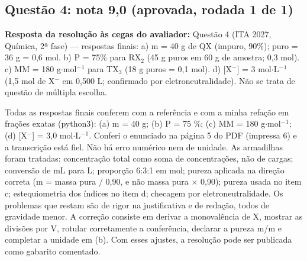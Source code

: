 \documentclass{article}%
\begin{document}
\subsection*{Questão 4: nota 9,0 (aprovada, rodada 1 de 1)}%
\textbf{Resposta da resolução às cegas do avaliador:} Questão 4 (ITA 2027, Química, 2ª fase) --- respostas finais:\newline%
\newline%
a) m = 40 g de QX (impuro, 90\%); puro = 36 g = 0,6 mol.\newline%
b) P = 75\% para RX$_{2}$ (45 g puros em 60 g de amostra; 0,3 mol).\newline%
c) MM = 180 g$\cdot$mol$^{-}$$^{1}$ para TX$_{3}$ (18 g puros = 0,1 mol).\newline%
d) {[}X$^{-}${]} = 3 mol$\cdot$L$^{-}$$^{1}$ (1,5 mol de X$^{-}$ em 0,500 L; confirmado por eletroneutralidade).\newline%
\newline%
Não se trata de questão de múltipla escolha.\par %
Todas as respostas finais conferem com a referência e com a minha refação em frações exatas (python3): (a) m = 40 g; (b) P = 75 \%; (c) MM = 180 g$\cdot$mol$^{-}$$^{1}$; (d) {[}X$^{-}${]} = 3,0 mol$\cdot$L$^{-}$$^{1}$. Conferi o enunciado na página 5 do PDF (impressa 6) e a transcrição está fiel. Não há erro numérico nem de unidade. As armadilhas foram tratadas: concentração total como soma de concentrações, não de cargas; conversão de mL para L; proporção 6:3:1 em mol; pureza aplicada na direção correta (m = massa pura / 0,90, e não massa pura $\times$ 0,90); pureza usada no item c; estequiometria dos índices no item d; checagem por eletroneutralidade. Os problemas que restam são de rigor na justificativa e de redação, todos de gravidade menor. A correção consiste em derivar a monovalência de X, mostrar as divisões por V, rotular corretamente a conferência, declarar a pureza m/m e completar a unidade em (b). Com esses ajustes, a resolução pode ser publicada como gabarito comentado.%
\end{document}
